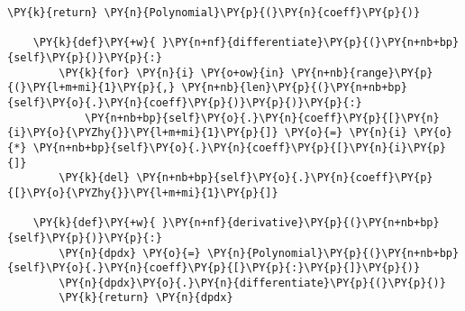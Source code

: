 \begin{example}
\begin{tcolorbox}[breakable, size=fbox, boxrule=1pt, pad at break*=1mm,colback=cellbackground, colframe=cellborder]
\begin{Verbatim}[commandchars=\\\{\}]
        \PY{k}{return} \PY{n}{Polynomial}\PY{p}{(}\PY{n}{coeff}\PY{p}{)}

    \PY{k}{def}\PY{+w}{ }\PY{n+nf}{differentiate}\PY{p}{(}\PY{n+nb+bp}{self}\PY{p}{)}\PY{p}{:}
        \PY{k}{for} \PY{n}{i} \PY{o+ow}{in} \PY{n+nb}{range}\PY{p}{(}\PY{l+m+mi}{1}\PY{p}{,} \PY{n+nb}{len}\PY{p}{(}\PY{n+nb+bp}{self}\PY{o}{.}\PY{n}{coeff}\PY{p}{)}\PY{p}{)}\PY{p}{:}
            \PY{n+nb+bp}{self}\PY{o}{.}\PY{n}{coeff}\PY{p}{[}\PY{n}{i}\PY{o}{\PYZhy{}}\PY{l+m+mi}{1}\PY{p}{]} \PY{o}{=} \PY{n}{i} \PY{o}{*} \PY{n+nb+bp}{self}\PY{o}{.}\PY{n}{coeff}\PY{p}{[}\PY{n}{i}\PY{p}{]}
        \PY{k}{del} \PY{n+nb+bp}{self}\PY{o}{.}\PY{n}{coeff}\PY{p}{[}\PY{o}{\PYZhy{}}\PY{l+m+mi}{1}\PY{p}{]}

    \PY{k}{def}\PY{+w}{ }\PY{n+nf}{derivative}\PY{p}{(}\PY{n+nb+bp}{self}\PY{p}{)}\PY{p}{:}
        \PY{n}{dpdx} \PY{o}{=} \PY{n}{Polynomial}\PY{p}{(}\PY{n+nb+bp}{self}\PY{o}{.}\PY{n}{coeff}\PY{p}{[}\PY{p}{:}\PY{p}{]}\PY{p}{)}
        \PY{n}{dpdx}\PY{o}{.}\PY{n}{differentiate}\PY{p}{(}\PY{p}{)}
        \PY{k}{return} \PY{n}{dpdx}


\end{Verbatim}
\end{tcolorbox}
\end{example}
